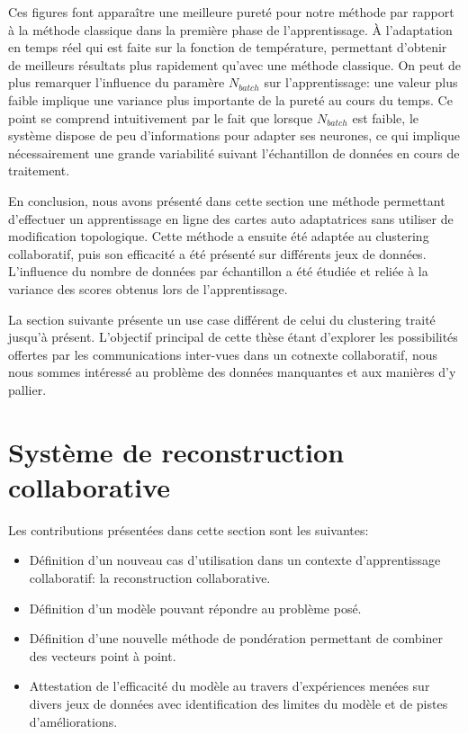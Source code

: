     Ces figures font apparaître une meilleure pureté pour notre méthode par rapport à la méthode classique dans la première phase de l'apprentissage. À l'adaptation en temps réel qui est faite sur la fonction de température, permettant d'obtenir de meilleurs résultats plus rapidement qu'avec une méthode classique. On peut de plus remarquer l'influence du paramère $N_{batch}$ sur l'apprentissage: une valeur plus faible implique une variance plus importante de la pureté au cours du temps. Ce point se comprend intuitivement par le fait que lorsque $N_{batch}$ est faible, le système dispose de peu d'informations pour adapter ses neurones, ce qui implique nécessairement une grande variabilité suivant l'échantillon de données en cours de traitement.

    En conclusion, nous avons présenté dans cette section une méthode permettant d'effectuer un apprentissage en ligne des cartes auto adaptatrices sans utiliser de modification topologique. Cette méthode a ensuite été adaptée au clustering collaboratif, puis son efficacité a été présenté sur différents jeux de données. L'influence du nombre de données par échantillon a été étudiée et reliée à la variance des scores obtenus lors de l'apprentissage.

    La section suivante présente un use case différent de celui du clustering traité jusqu'à présent. L'objectif principal de cette thèse étant d'explorer les possibilités offertes par les communications inter-vues dans un cotnexte collaboratif, nous nous sommes intéressé au problème des données manquantes et aux manières d'y pallier.

\section{Syst\`{e}me de reconstruction collaborative}

Les contributions présentées dans cette section sont les suivantes:
\begin{itemize}
    \item Définition d'un nouveau cas d'utilisation dans un contexte d'apprentissage collaboratif: la reconstruction collaborative.
    \item Définition d'un modèle pouvant répondre au problème posé.
    \item Définition d'une nouvelle méthode de pondération permettant de combiner des vecteurs point à point.
    \item Attestation de l'efficacité du modèle au travers d'expériences menées sur divers jeux de données avec identification des limites du modèle et de pistes d'améliorations.
\end{itemize}

